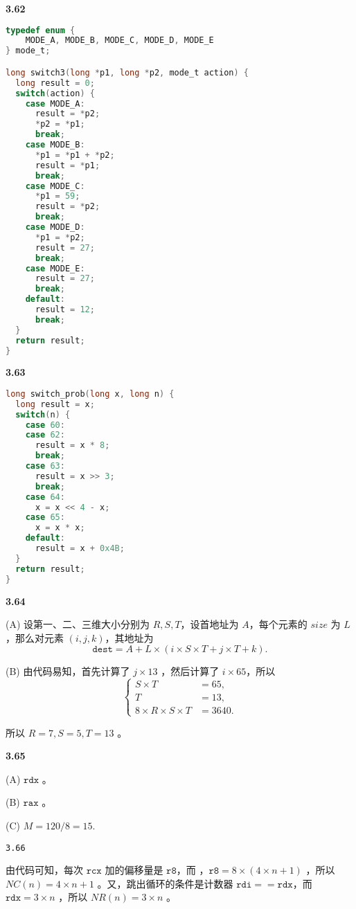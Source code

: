 \documentclass{article}
\begin{document}
\textbf{3.62}

\begin{lstlisting}[language=C]
typedef enum { 
	MODE_A, MODE_B, MODE_C, MODE_D, MODE_E 
} mode_t;

long switch3(long *p1, long *p2, mode_t action) {
  long result = 0;
  switch(action) {
    case MODE_A:
      result = *p2;
      *p2 = *p1;
      break;
    case MODE_B:
      *p1 = *p1 + *p2;
      result = *p1;
      break;
    case MODE_C:
      *p1 = 59;
      result = *p2;
      break;
    case MODE_D:
      *p1 = *p2;
      result = 27;
      break;
    case MODE_E:
      result = 27;
      break;
    default:
      result = 12;
      break;
  }
  return result;
}
\end{lstlisting}

\textbf{3.63}

\begin{lstlisting}[language=C]
long switch_prob(long x, long n) {
  long result = x;
  switch(n) {
    case 60:
    case 62:
      result = x * 8;
      break;
    case 63:
      result = x >> 3;
      break;
    case 64:
      x = x << 4 - x;
    case 65:
      x = x * x;
    default:
      result = x + 0x4B;
  }
  return result;
}
\end{lstlisting}

\textbf{3.64}

(A) 设第一、二、三维大小分别为 $R, S, T$，设首地址为 $A$，每个元素的 $size$ 为 $L$，那么对元素 $(i, j, k)$，其地址为
$$
\texttt{dest} = A + L \times (i \times S \times T + j \times T + k).
$$

(B) 由代码易知，首先计算了 $j \times 13$ ，然后计算了 $i \times 65$，所以
$$
\begin{cases}
S \times T &= 65, \\ 
T &= 13, \\ 
8\times R \times S \times T &= 3640 .
\end{cases}
$$

所以 $R = 7, S = 5, T = 13$ 。


\textbf{3.65}

(A) $\texttt{rdx}$ 。

(B) $\texttt{rax}$ 。

(C) $M = 120 / 8 = 15.$

\texttt{3.66}

由代码可知，每次 $\texttt{rcx}$ 加的偏移量是 $\texttt{r8}$，而 $，\texttt{r8} = 8\times(4\times n + 1)$ ，所以 $NC(n) = 4\times n + 1$ 。又，跳出循环的条件是计数器 $\texttt{rdi} == \texttt{rdx}$，而 $\texttt{rdx} = 3\times n$ ，所以 $NR(n) = 3\times n$ 。
\end{document}
